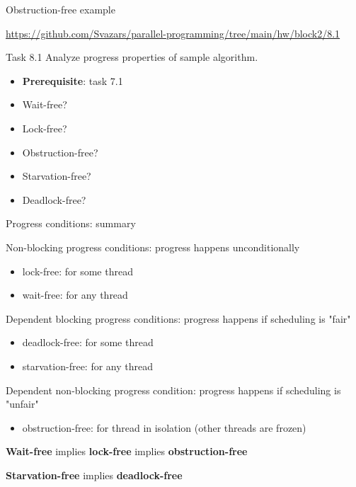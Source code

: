 
\begin{frame}{Obstruction-free example}

{\small\url{https://github.com/Svazars/parallel-programming/tree/main/hw/block2/8.1}}
\begin{homeworkmail}{Task 8.1}
    Analyze progress properties of sample algorithm.
    \begin{itemize}
      \item \textbf{Prerequisite}: task 7.1
      \item Wait-free? 
      \item Lock-free? 
      \item Obstruction-free?
      \item Starvation-free?
      \item Deadlock-free?
    \end{itemize}
\end{homeworkmail}

\end{frame}

\begin{frame}{Progress conditions: summary}

Non-blocking progress conditions: progress happens unconditionally
\begin{itemize}
  \item lock-free: for some thread
  \item wait-free: for any thread
\end{itemize}

Dependent blocking progress conditions: progress happens if scheduling is "fair"
\begin{itemize}
  \item deadlock-free: for some thread
  \item starvation-free: for any thread
\end{itemize}

Dependent non-blocking progress condition: progress happens if scheduling is "unfair"
\begin{itemize}
  \item obstruction-free: for thread in isolation (other threads are frozen)
\end{itemize}

\pause

\begin{theorem}
\textbf{Wait-free} implies \textbf{lock-free} implies \textbf{obstruction-free}

\textbf{Starvation-free} implies \textbf{deadlock-free}
\end{theorem}

\end{frame}


